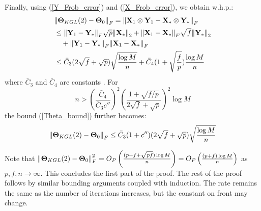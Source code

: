 \begin{IEEEproof}
Finally, using (\ref{Y_Frob_error}) and (\ref{X_Frob_error}), we obtain w.h.p.:
\begin{align}
	& { \parallel } {\mathbf{\Theta}}_{KGL}(2)-{\mathbf{\Theta}}_0 { \parallel }_F = { \parallel } {\mathbf{X}}_1 \otimes {\mathbf{Y}}_1 - {\mathbf{X}}_* \otimes {\mathbf{Y}}_* { \parallel }_F \nonumber \\
		&\leq { \parallel } {\mathbf{Y}}_1-{\mathbf{Y}}_*{ \parallel }_F \sqrt{p} { \parallel } {\mathbf{X}}_*{ \parallel }_2 + { \parallel } {\mathbf{X}}_1-{\mathbf{X}}_*{ \parallel }_F \sqrt{f} { \parallel } {\mathbf{Y}}_*{ \parallel }_2 \nonumber \\
		&\quad + { \parallel } {\mathbf{Y}}_1-{\mathbf{Y}}_*{ \parallel }_F { \parallel } {\mathbf{X}}_1-{\mathbf{X}}_*{ \parallel }_F \nonumber \\
		&\leq \bar{C}_3 (2\sqrt{f}+\sqrt{p}) \sqrt{\frac{\log M}{n}} + \bar{C}_4 (1+\sqrt{\frac{f}{p}}) \frac{\log M}{n} \label{Theta_bound}
\end{align}
where $\bar{C}_3$ and $\bar{C}_4$ are constants \cite{TsiligkaridisTSP}.
For
\begin{equation*}
	n>(\frac{\bar{C}_4}{\bar{C}_3 c''})^2 \left(\frac{1+\sqrt{f/p}}{2\sqrt{f}+\sqrt{p}}\right)^2 \log M
\end{equation*}
the bound (\ref{Theta_bound}) further becomes:
\begin{equation*}
	{ \parallel } {\mathbf{\Theta}}_{KGL}(2)-{\mathbf{\Theta}}_0 { \parallel }_F \leq \bar{C}_3 (1+c'') (2\sqrt{f}+\sqrt{p}) \sqrt{\frac{\log M}{n}}
\end{equation*}

Note that ${ \parallel } {\mathbf{\Theta}}_{KGL}(2)-{\mathbf{\Theta}}_0 { \parallel }_F^2 = O_P\left( \frac{ (p+f+\sqrt{pf}) \log M}{n} \right) =  O_P\left( \frac{ (p+f) \log M}{n} \right)$ as $p,f,n\to\infty$. This concludes the first part of the proof. The rest of the proof follows by similar bounding arguments coupled with induction. The rate remains the same as the number of iterations increases, but the constant on front may change.


\end{IEEEproof}
